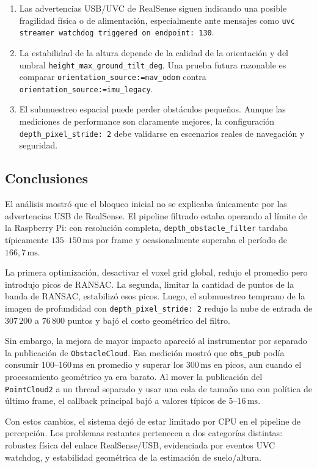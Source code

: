 \begin{enumerate}
  \item Las advertencias USB/UVC de RealSense siguen indicando una posible
        fragilidad física o de alimentación, especialmente ante mensajes como
        \texttt{uvc streamer watchdog triggered on endpoint: 130}.
  \item La estabilidad de la altura depende de la calidad de la orientación y
        del umbral \texttt{height\_max\_ground\_tilt\_deg}. Una prueba futura
        razonable es comparar \texttt{orientation\_source:=nav\_odom} contra
        \texttt{orientation\_source:=imu\_legacy}.
  \item El submuestreo espacial puede perder obstáculos pequeños. Aunque las
        mediciones de performance son claramente mejores, la configuración
        \texttt{depth\_pixel\_stride: 2} debe validarse en escenarios reales de
        navegación y seguridad.
\end{enumerate}

\subsection{Conclusiones}
\label{subsec:perf-conclusiones}

El análisis mostró que el bloqueo inicial no se explicaba únicamente por las
advertencias USB de RealSense. El pipeline filtrado estaba operando al límite
de la Raspberry Pi: con resolución completa, \texttt{depth\_obstacle\_filter}
tardaba típicamente $135$--$150\,\mathrm{ms}$ por frame y ocasionalmente
superaba el período de $166{,}7\,\mathrm{ms}$.

La primera optimización, desactivar el voxel grid global, redujo el promedio
pero introdujo picos de RANSAC. La segunda, limitar la cantidad de puntos de la
banda de RANSAC, estabilizó esos picos. Luego, el submuestreo temprano de la
imagen de profundidad con \texttt{depth\_pixel\_stride: 2} redujo la nube de
entrada de $307\,200$ a $76\,800$ puntos y bajó el costo geométrico del filtro.

Sin embargo, la mejora de mayor impacto apareció al instrumentar por separado
la publicación de \texttt{ObstacleCloud}. Esa medición mostró que
\texttt{obs\_pub} podía consumir $100$--$160\,\mathrm{ms}$ en promedio y
superar los $300\,\mathrm{ms}$ en picos, aun cuando el procesamiento geométrico
ya era barato. Al mover la publicación del \texttt{PointCloud2} a un thread
separado y usar una cola de tamaño uno con política de último frame, el callback
principal bajó a valores típicos de $5$--$16\,\mathrm{ms}$.

Con estos cambios, el sistema dejó de estar limitado por CPU en el pipeline de
percepción. Los problemas restantes pertenecen a dos categorías distintas:
robustez física del enlace RealSense/USB, evidenciada por eventos UVC watchdog,
y estabilidad geométrica de la estimación de suelo/altura.
